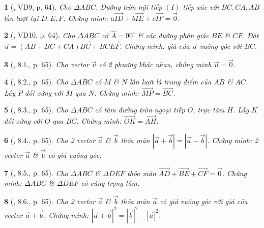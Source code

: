 \documentclass{article}
\newtheorem{baitoan}{}
\begin{document}
\begin{baitoan}[\cite{Hai_Hung_Thu_Tung2022_tap_1}, VD9, p. 64]
	Cho $\Delta ABC$. Đường tròn nội tiếp $(I)$ tiếp xúc với $BC,CA,AB$ lần lượt tại $D,E,F$. Chứng minh: $a\overrightarrow{ID} + b\overrightarrow{IE} + c\overrightarrow{IF} = \vec{0}$.
\end{baitoan}

\begin{baitoan}[\cite{Hai_Hung_Thu_Tung2022_tap_1}, VD10, p. 64]
	Cho $\Delta ABC$ có $\widehat{A} = 90^\circ$ \& các đường phân giác $BE$ \& $CF$. Đặt $\vec{u} = (AB + BC + CA)\overrightarrow{BC} + BC\overrightarrow{EF}$. Chứng minh: giá của $\vec{u}$ vuông góc với $BC$.
\end{baitoan}

\begin{baitoan}[\cite{Hai_Hung_Thu_Tung2022_tap_1}, 8.1., p. 65]
	Cho vector $\vec{u}$ có 2 phương khác nhau, chứng minh $\vec{u} = \vec{0}$.
\end{baitoan}

\begin{baitoan}[\cite{Hai_Hung_Thu_Tung2022_tap_1}, 8.2., p. 65]
	Cho $\Delta ABC$ có $M$ \& $N$ lần lượt là trung điểm của $AB$ \& $AC$. Lấy $P$ đối xứng với $M$ qua $N$. Chứng minh: $\overrightarrow{MP} = \overrightarrow{BC}$.
\end{baitoan}

\begin{baitoan}[\cite{Hai_Hung_Thu_Tung2022_tap_1}, 8.3., p. 65]
	Cho $\Delta ABC$ có tâm đường tròn ngoại tiếp $O$, trực tâm $H$. Lấy $K$ đối xứng với $O$ qua $BC$. Chứng minh: $\overrightarrow{OK} = \overrightarrow{AH}$.
\end{baitoan}

\begin{baitoan}[\cite{Hai_Hung_Thu_Tung2022_tap_1}, 8.4., p. 65]
	Cho 2 vector $\vec{a}$ \& $\vec{b}$ thỏa mãn $|\vec{a} + \vec{b}| = |\vec{a} - \vec{b}|$. Chứng minh: 2 vector $\vec{a}$ \& $\vec{b}$ có giá vuông góc.
\end{baitoan}

\begin{baitoan}[\cite{Hai_Hung_Thu_Tung2022_tap_1}, 8.5., p. 65]
	Cho $\Delta ABC$ \& $\Delta DEF$ thỏa mãn $\overrightarrow{AD} + \overrightarrow{BE} + \overrightarrow{CF} = \vec{0}$. Chứng minh: $\Delta ABC$ \& $\Delta DEF$ có cùng trọng tâm.
\end{baitoan}

\begin{baitoan}[\cite{Hai_Hung_Thu_Tung2022_tap_1}, 8.6., p. 65]
	Cho 2 vector $\vec{a}$ \& $\vec{b}$ thỏa mãn $\vec{a}$ có giá vuông góc với giá của vector $\vec{a} + \vec{b}$. Chứng minh: $|\vec{a} + \vec{b}|^2 = |\vec{b}|^2 - |\vec{a}|^2$.
\end{baitoan}
\end{document}

